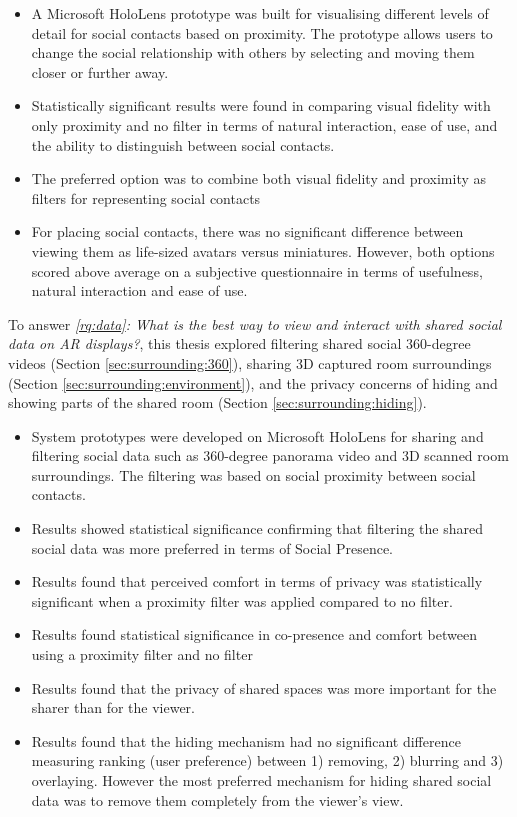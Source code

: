 \begin{itemize}
    \item{A Microsoft HoloLens prototype was built for visualising different levels of detail for social contacts based on proximity. The prototype allows users to change the social relationship with others by selecting and moving them closer or further away.}
    \item{Statistically significant results were found in comparing visual fidelity with only proximity and no filter in terms of natural interaction, ease of use, and the ability to distinguish between social contacts.}
    \item{The preferred option was to combine both visual fidelity and proximity as filters for representing social contacts}
    \item{For placing social contacts, there was no significant difference between viewing them as life-sized avatars versus miniatures. However, both options scored above average on a subjective questionnaire in terms of usefulness, natural interaction and ease of use.}
\end{itemize}

\noindent
To answer \textit{\ref{rq:data}: What is the best way to view and interact with shared social data on AR displays?}, this thesis explored filtering shared social 360-degree videos (Section \ref{sec:surrounding:360}), sharing 3D captured room surroundings (Section \ref{sec:surrounding:environment}), and the privacy concerns of hiding and showing parts of the shared room (Section \ref{sec:surrounding:hiding}). 

\begin{itemize}
    \item{System prototypes were developed on Microsoft HoloLens for sharing and filtering social data such as 360-degree panorama video and 3D scanned room surroundings. The filtering was based on social proximity between social contacts.}
    \item{Results showed statistical significance confirming that filtering the shared social data was more preferred in terms of Social Presence.}
    \item{Results found that perceived comfort in terms of privacy was statistically significant when a proximity filter was applied compared to no filter.}
    \item{Results found statistical significance in co-presence and comfort between using a proximity filter and no filter}
    \item{Results found that the privacy of shared spaces was more important for the sharer than for the viewer.}
    \item{Results found that the hiding mechanism had no significant difference measuring ranking (user preference) between 1) removing, 2) blurring and 3) overlaying. However the most preferred mechanism for hiding shared social data was to remove them completely from the viewer's view.}
\end{itemize}

